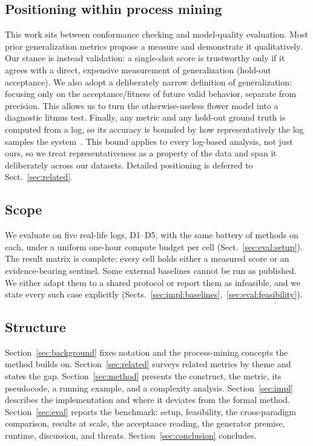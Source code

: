 \documentclass[runningheads]{llncs}
\newcommand{\chg}[1]{\textcolor{chgblue}{#1}}
\begin{document}
\subsection{Positioning within process mining}
This work sits between conformance checking and model-quality evaluation. Most prior generalization metrics propose a measure and demonstrate it qualitatively. Our stance is instead validation: a single-shot score is trustworthy only if it agrees with a direct, expensive measurement of generalization (hold-out acceptance). We also adopt a deliberately narrow definition of generalization: focusing only on the acceptance/fitness of future valid behavior, separate from precision. This allows us to turn the otherwise-useless flower model into a diagnostic litmus test. Finally, any metric and any hold-out ground truth is computed from a log, so its accuracy is bounded by how representatively the log samples the system~\cite{karunaratne2024representativeness}. This bound applies to every log-based analysis, not just ours, so we treat representativeness as a property of the data and span it deliberately across our datasets. Detailed positioning is deferred to Sect.~\ref{sec:related}.

\subsection{Scope}
\label{sec:scope}
\chg{We evaluate on five real-life logs, D1--D5, with the same battery of methods on each, under a uniform one-hour compute budget per cell (Sect.~\ref{sec:eval:setup}). The result matrix is complete: every cell holds either a measured score or an evidence-bearing sentinel.} Some external baselines cannot be run as published. We either adapt them to a shared protocol or report them as infeasible, and we state every such case explicitly (Sects.~\ref{sec:impl:baselines},~\ref{sec:eval:feasibility}).

\subsection{Structure}
Section~\ref{sec:background} fixes notation and the process-mining concepts the method builds on. Section~\ref{sec:related} surveys related metrics by theme and states the gap. Section~\ref{sec:method} presents the construct, the metric, its pseudocode, a running example, and a complexity analysis. Section~\ref{sec:impl} describes the implementation and where it deviates from the formal method. Section~\ref{sec:eval} reports the benchmark: setup, feasibility, \chg{the cross-paradigm comparison, results at scale, the acceptance reading, the generator premise, runtime, discussion, and threats}. Section~\ref{sec:conclusion} concludes.
\end{document}
